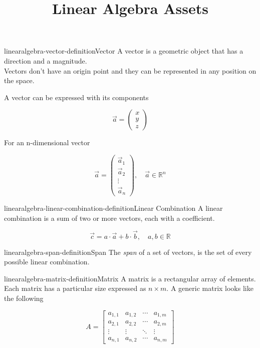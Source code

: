 \documentclass[preview]{standalone}
\begin{document}
\title{Linear Algebra Assets}

\begin{snippetdefinition}{linearalgebra-vector-definition}{Vector}
    A vector is a geometric object that has a direction and a magnitude. \\
    Vectors don't have an origin point and they can be represented in any position on the space.

    A vector can be expressed with its components

    \[
        \vec{a} =
        \begin{pmatrix}
            x \\
            y \\
            z
        \end{pmatrix}
    \]

    For an n-dimensional vector

    \[
        \vec{a} =
        \begin{pmatrix}
            \vec{a}_1 \\
            \vec{a}_2 \\
            \vdots \\
            \vec{a}_n
        \end{pmatrix},
        \quad \vec{a} \in \mathbb{R}^n
    \]
\end{snippetdefinition}

\begin{snippetdefinition}{linearalgebra-linear-combination-definition}{Linear Combination}
    A linear combination is a sum of two or more vectors, each with a coefficient.

    \[
        \vec{c} = a \cdot\vec{a} + b\cdot\vec{b},
        \quad a,b\in \mathbb{R}
    \]
\end{snippetdefinition}

\begin{snippetdefinition}{linearalgebra-span-definition}{Span}
    The \textit{span} of a set of vectors, is the set of every possible linear combination.
\end{snippetdefinition}

\begin{snippetdefinition}{linearalgebra-matrix-definition}{Matrix}
    A matrix is a rectangular array of elements.
    Each matrix has a particular size expressed as \(n \times m\).
    A generic matrix looks like the following

    \[
    A = \begin{bmatrix} 
            a_{1,1} & a_{1,2} & \cdots & a_{1,m} \\
            a_{2,1} & a_{2,2} & \cdots & a_{2,m} \\
            \vdots  & \vdots  & \ddots & \vdots  \\
            a_{n,1} & a_{n,2} & \cdots & a_{n,m} 
        \end{bmatrix}
    \]
\end{snippetdefinition}
\end{document}

